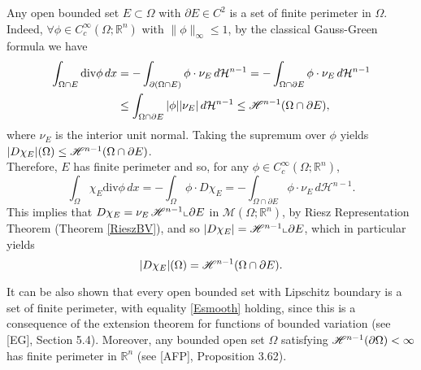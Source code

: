 \begin{example} Any open bounded set $E \subset \Omega$ with $\partial E \in C^{2}$ is a set of finite perimeter in $\Omega$.
\\ 
Indeed, $\forall \phi \in C_{c}^{\infty}(\Omega; \mathbb{R}^{n})$ with $\|\phi\|_{\infty} \le 1$, by the classical Gauss-Green formula we have
\begin{align*} \int_{\Omega \cap E} \mathrm{div} \phi \, dx & = - \int_{\partial(\Omega \cap E)} \phi \cdot \nu_{E} \, d\mathcal{H}^{n - 1}  = - \int_{\Omega \cap \partial E} \phi \cdot \nu_{E} \, d\mathcal{H}^{n - 1} \\
& \le \int_{\Omega \cap \partial E} |\phi| |\nu_{E}| \, d\mathcal{H}^{n - 1} \le \mathscr{H}^{n - 1}(\Omega \cap \partial E), 
\end{align*}
where $\nu_{E}$ is the interior unit normal. Taking the supremum over $\phi$ yields $|D \chi_{E}|(\Omega) \le \mathscr{H}^{n - 1}(\Omega \cap \partial E)$.
\\
Therefore, $E$ has finite perimeter and so, for any $\phi \in C^{\infty}_{c}(\Omega; \mathbb{R}^{n})$,
\[ \int_{\Omega} \chi_{E} \mathrm{div} \phi \, dx = - \int_{\Omega} \phi \cdot D \chi_{E} = - \int_{\Omega \cap \partial E} \phi \cdot \nu_{E} \, d\mathcal{H}^{n - 1}. \] 
This implies that $D \chi_{E} = \nu_{E} \, \mathscr{H}^{n - 1} \llcorner \partial E$ in $\mathcal{M}(\Omega; \mathbb{R}^{n})$, by Riesz Representation Theorem (Theorem \ref{RieszBV}), and so $|D \chi_{E}| = \mathscr{H}^{n - 1} \llcorner \partial E$, which in particular yields
\begin{equation} \label{Esmooth} |D \chi_{E}|(\Omega) = \mathscr{H}^{n - 1} (\Omega \cap \partial E). \end{equation}
\end{example}

\begin{remark} \label{finpersetexample} It can be also shown that every open bounded set with Lipschitz boundary is a set of finite perimeter, with equality \eqref{Esmooth} holding, since this is a consequence of the extension theorem for functions of bounded variation (see [EG], Section 5.4). Moreover, any bounded open set $\Omega$ satisfying $\mathscr{H}^{n - 1}(\partial \Omega) < \infty$ has finite perimeter in $\mathbb{R}^{n}$ (see [AFP], Proposition 3.62).
\end{remark}


